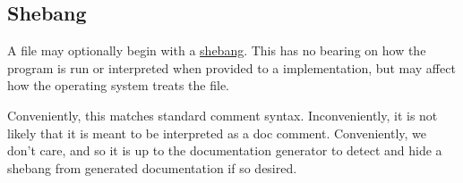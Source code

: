 \subsection{Shebang}

A \Trilogy{} file may optionally begin with a
\href{https://en.wikipedia.org/wiki/Shebang_(Unix)}{shebang}. This has no bearing
on how the program is run or interpreted when provided to a \Trilogy{} implementation,
but may affect how the operating system treats the file.

Conveniently, this matches standard comment syntax. Inconveniently, it is not
likely that it is meant to be interpreted as a doc comment. Conveniently,
we don't care, and so it is up to the documentation generator to detect and
hide a shebang from generated documentation if so desired.

\FloatBarrier
